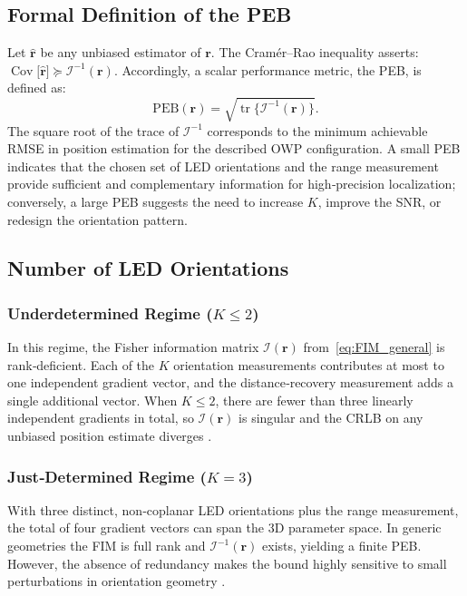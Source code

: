 \documentclass[journal]{IEEEtran}
\begin{document}
\subsection{Formal Definition of the PEB}
Let \(\hat{\mathbf r}\) be any unbiased estimator of \(\mathbf r\).  The
Cramér–Rao inequality asserts:
\(
\operatorname{Cov}\!\bigl[\hat{\mathbf r}\bigr]
\succeq
\mathcal{I}^{-1}(\mathbf r).
\)
Accordingly, a scalar performance metric, the PEB, is defined as:
\begin{equation}
\mathrm{PEB}(\mathbf r)
= \sqrt{\operatorname{tr}\!\bigl\{\mathcal{I}^{-1}(\mathbf r)\bigr\}}.
\label{eq:PEB}
\end{equation}
The square root of the trace of \(\mathcal{I}^{-1}\) corresponds to the minimum achievable
RMSE in position estimation for the described OWP configuration.
A small PEB indicates that the chosen set of LED orientations and the range measurement
provide sufficient and complementary information for high‐precision localization; conversely,
a large PEB suggests the need to increase \(K\), improve the SNR,
or redesign the orientation pattern.

\subsection{Number of LED Orientations}
\label{subsec:Kchoice}

\subsubsection{Underdetermined Regime (\(K\le2\))}
In this regime, the Fisher information matrix
\(\mathcal{I}(\mathbf r)\) from~\eqref{eq:FIM_general} is rank‐deficient.
Each of the \(K\) orientation measurements contributes at most to one
independent gradient vector, and the distance‐recovery measurement adds
a single additional vector.  When \(K\le2\), there are fewer than three
linearly independent gradients in total, so \(\mathcal{I}(\mathbf r)\) is
singular and the CRLB on any unbiased position estimate diverges
\cite{Zhuang2018}.

\subsubsection{Just‐Determined Regime (\(K=3\))}
With three distinct, non‐coplanar LED orientations plus the range
measurement, the total of four gradient vectors can span the
3D parameter space.  In generic geometries the FIM is
full rank and \(\mathcal{I}^{-1}(\mathbf r)\) exists, yielding a finite
PEB.  However, the absence of redundancy makes the bound highly
sensitive to small perturbations in orientation geometry
\cite{Chen2021}.
\end{document}
